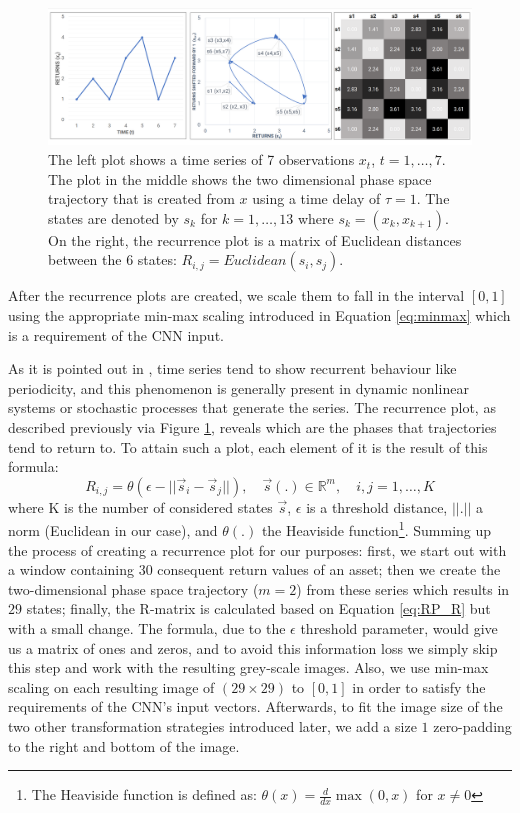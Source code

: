 \documentclass[11pt, a4paper]{article}
\begin{document}
\begin{figure}[]
    \centering
    \includegraphics[width=\textwidth]{images/RP.PNG}
    \caption{The left plot shows a time series of 7 observations $x_t$, $t=1,\dots,7$. The plot in the middle shows the two dimensional phase space trajectory that is created from $x$ using a time delay of $\tau = 1$. The states are denoted by $s_k$ for $k=1,\dots,13$ where $s_k = (x_k, x_{k+1})$. On the right, the recurrence plot is a matrix of Euclidean distances between the 6 states: $R_{i,j} = Euclidean(s_i,s_j)$.}
    \label{fig:RP_Def}
\end{figure}

After the recurrence plots are created, we scale them to fall in the interval $[0, 1]$ using the appropriate min-max scaling introduced in Equation \ref{eq:minmax} which is a requirement of the CNN input. 

As it is pointed out in \cite{hatami2018classification}, time series tend to show recurrent behaviour like periodicity, and this phenomenon is generally present in dynamic nonlinear systems or stochastic processes that generate the series. The recurrence plot, as described previously via Figure \ref{fig:RP_Def}, reveals which are the phases that trajectories tend to return to. To attain such a plot, each element of it is the result of this formula:
\begin{equation}
\label{eq:RP_R}
    R_{i,j} = \theta(\epsilon-||\vec{s}_i - \vec{s}_j||),\quad \vec{s}(.) \in \mathbb{R}^m, \quad i,j = 1,\dots,K
\end{equation}
where K is the number of considered states $\vec{s}$, $\epsilon$ is a threshold distance, $||.||$ a norm (Euclidean in our case), and $\theta(.)$ the Heaviside function\footnote{The Heaviside function is defined as: $\theta(x) = \frac{d}{dx}\max(0,x)$ for $x \neq 0$}. Summing up the process of creating a recurrence plot for our purposes: first, we start out with a window containing $30$ consequent return values of an asset; then we create the two-dimensional phase space trajectory ($m=2$) from these series which results in $29$ states; finally, the R-matrix is calculated based on Equation \ref{eq:RP_R} but with a small change. The formula, due to the $\epsilon$ threshold parameter, would give us a matrix of ones and zeros, and to avoid this information loss we simply skip this step and work with the resulting grey-scale images. Also, we use min-max scaling on each resulting image of $(29 \times 29)$ to $[0, 1]$ in order to satisfy the requirements of the CNN's input vectors. Afterwards, to fit the image size of the two other transformation strategies introduced later, we add a size $1$ zero-padding to the right and bottom of the image.
\end{document}
